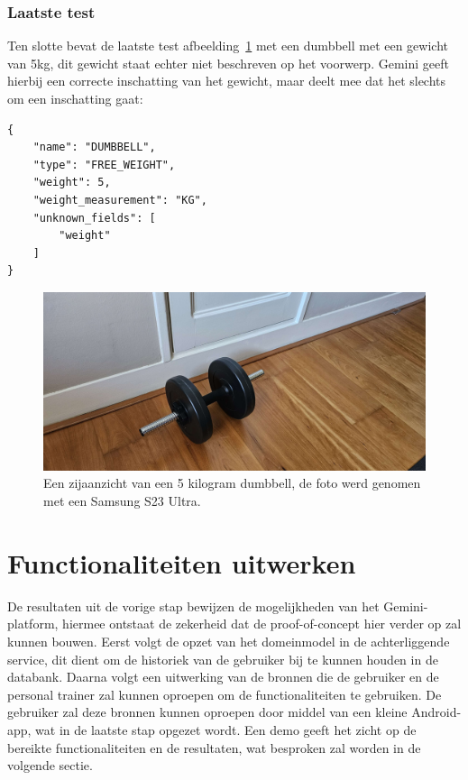 \subsubsection{Laatste test}
Ten slotte bevat de laatste test afbeelding~\ref{fig:test-drie} met een dumbbell met een gewicht van 5kg, dit gewicht staat echter niet beschreven op het voorwerp.
Gemini geeft hierbij een correcte inschatting van het gewicht, maar deelt mee dat het slechts om een inschatting gaat:
\begin{mdframed}[backgroundcolor=bg]
    \begin{verbatim}
{
    "name": "DUMBBELL",
    "type": "FREE_WEIGHT",
    "weight": 5,
    "weight_measurement": "KG",
    "unknown_fields": [
        "weight"
    ]
}
    \end{verbatim}
\end{mdframed}

\begin{figure}[H]
    \begin{center}
        \includegraphics[scale=0.1]{images/prompt3-image}
        \caption{Een zijaanzicht van een 5 kilogram dumbbell, de foto werd genomen met een Samsung S23 Ultra.}
        \label{fig:test-drie}
    \end{center}
\end{figure}

\section{Functionaliteiten uitwerken}
\label{sec:functionaliteiten-uitwerken}
De resultaten uit de vorige stap bewijzen de mogelijkheden van het Gemini-platform, hiermee ontstaat de zekerheid dat de proof-of-concept hier verder op zal kunnen bouwen.
Eerst volgt de opzet van het domeinmodel in de achterliggende service, dit dient om de historiek van de gebruiker bij te kunnen houden in de databank.
Daarna volgt een uitwerking van de bronnen die de gebruiker en de personal trainer zal kunnen oproepen om de functionaliteiten te gebruiken.
De gebruiker zal deze bronnen kunnen oproepen door middel van een kleine Android-app, wat in de laatste stap opgezet wordt.
Een demo geeft het zicht op de bereikte functionaliteiten en de resultaten, wat besproken zal worden in de volgende sectie.

